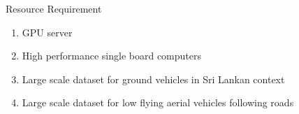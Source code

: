 
Resource Requirement

\begin{enumerate}
\item GPU server 
\item High performance single board computers
\item Large scale dataset for ground vehicles in Sri Lankan context
\item Large scale dataset for low flying aerial vehicles following roads

\end{enumerate}


